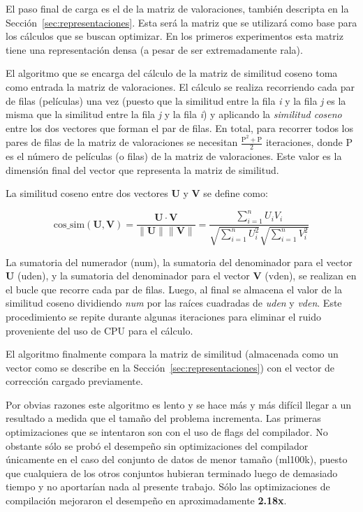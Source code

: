 \documentclass[11pt, a4paper]{article}
\begin{document}
  El paso final de carga es el de la matriz de valoraciones, también descripta
  en la Sección~\ref{sec:representaciones}.  Esta será la matriz que se
  utilizará como base para los cálculos que se buscan optimizar. En los
  primeros experimentos esta matriz tiene una representación densa (a pesar de
  ser extremadamente rala).

  El algoritmo que se encarga del cálculo de la matriz de similitud coseno toma
  como entrada la matriz de valoraciones. El cálculo se realiza recorriendo
  cada par de filas (películas) una vez (puesto que la similitud entre la fila
  {\em i} y la fila {\em j} es la misma que la similitud entre la fila {\em j}
  y la fila {\em i}) y aplicando la {\em similitud coseno} entre los dos
  vectores que forman el par de filas.  En total, para recorrer todos los pares
  de filas de la matriz de valoraciones se necesitan
  $\frac{\text{P}^2+\text{P}}{2}$ iteraciones, donde P es el número de
  películas (o filas) de la matriz de valoraciones. Este valor es la dimensión
  final del vector que representa la matriz de similitud.

  La similitud coseno entre dos vectores \textbf{U} y \textbf{V} se define
  como:

  \[
      \text{cos\_sim}(\mathbf{U}, \mathbf{V}) = {\frac{\mathbf{U}\cdot\mathbf{V}}{\|\mathbf{U}\|\|\mathbf{V}\|}} = 
      {\frac {\sum \limits _{i=1}^{n}{U_{i}V_{i}}}{{\sqrt {\sum \limits _{i=1}^{n}{U_{i}^{2}}}}
      {\sqrt {\sum \limits _{i=1}^{n}{V_{i}^{2}}}}}}
  \]

  La sumatoria del numerador (num), la sumatoria del denominador para el vector
  \textbf{U} (uden), y la sumatoria del denominador para el vector \textbf{V}
  (vden), se realizan en el bucle que recorre cada par de filas. Luego, al
  final se almacena el valor de la similitud coseno dividiendo {\em num} por
  las raíces cuadradas de {\em uden} y {\em vden}. Este procedimiento se
  repite durante algunas iteraciones para eliminar el ruido proveniente del uso
  de CPU para el cálculo. 

  El algoritmo finalmente compara la matriz de similitud (almacenada como un
  vector como se describe en la Sección~\ref{sec:representaciones}) con el
  vector de corrección cargado previamente.

  Por obvias razones este algoritmo es lento y se hace más y más difícil llegar
  a un resultado a medida que el tamaño del problema incrementa. Las primeras
  optimizaciones que se intentaron son con el uso de flags del compilador. No
  obstante sólo se probó el desempeño sin optimizaciones del compilador
  únicamente en el caso del conjunto de datos de menor tamaño (ml100k), puesto
  que cualquiera de los otros conjuntos hubieran terminado luego de demasiado
  tiempo y no aportarían nada al presente trabajo. Sólo las optimizaciones de
  compilación mejoraron el desempeño en aproximadamente {\bf 2.18x}.
\end{document}
